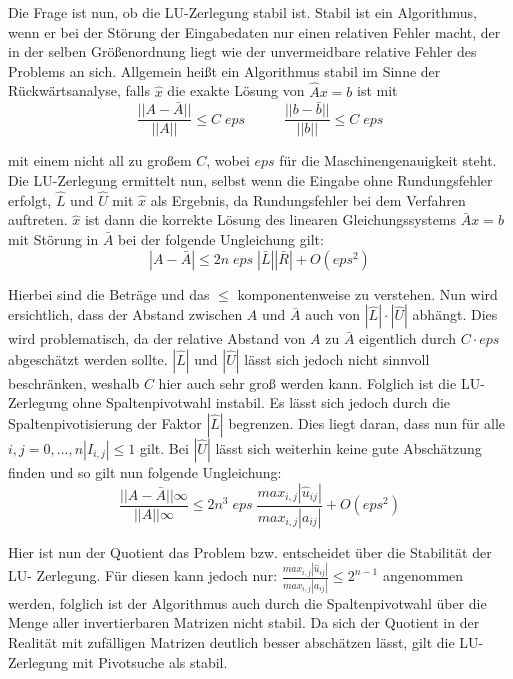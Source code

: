 \documentclass[course=erap]{aspdoc}
\begin{document}
Die Frage ist nun, ob die LU-Zerlegung stabil ist.
Stabil ist ein Algorithmus, wenn er bei der Störung der Eingabedaten nur einen relativen Fehler macht, 
der in der selben Größenordnung liegt wie der unvermeidbare relative Fehler des Problems an sich. 
Allgemein heißt ein Algorithmus stabil im Sinne der Rückwärtsanalyse, 
falls $\hat{x}$ die exakte Lösung von $\hat{A}x = b$ ist mit 	
  \begin{equation}
    \label{norm}
    \frac{|| A - \bar{A}||}{||A||} \leq C \; eps \;\; \;\;\;\;\;\;\;\;  \frac{|| b - \bar{b}||}{||b||} \leq C \; eps
  \end{equation}

mit einem nicht all zu großem $C$, wobei $eps$ für die Maschinengenauigkeit steht.
Die LU-Zerlegung ermittelt nun, selbst wenn die Eingabe ohne Rundungsfehler erfolgt, $\hat{L}$ und $\hat{U}$ mit 
$\hat{x}$ als Ergebnis, da Rundungsfehler bei dem Verfahren auftreten. $\hat{x}$ ist dann die 
korrekte Lösung des linearen Gleichungssystems $\bar{A}x=b$ mit Störung in $\bar{A}$ bei der folgende Ungleichung gilt:
  \begin{equation}
    \label{eg3}
    |A - \bar{A}| \leq 2n \; eps \; |\bar{L}||\bar{R}| + O(eps^2)
  \end{equation}

Hierbei sind die Beträge und das $\leq$ komponentenweise zu verstehen.								
Nun wird ersichtlich, dass der Abstand zwischen $A$ und $\bar{A}$ auch von $|\hat{L}| \cdot |\hat{U}|$
abhängt. Dies wird problematisch, da der relative Abstand von $A$ zu $\bar{A}$ eigentlich durch 
$C\cdot eps$ abgeschätzt werden sollte. $|\hat{L}|$ und $|\hat{U}|$ lässt sich jedoch nicht sinnvoll 
beschränken, weshalb $C$ hier auch sehr groß werden kann.
Folglich ist die LU-Zerlegung ohne Spaltenpivotwahl instabil. Es lässt sich jedoch durch die Spaltenpivotisierung 
der Faktor $|\hat{L}|$  begrenzen. Dies liegt daran, dass nun für alle $i,j = 0,...,n |I_{i,j}| \leq 1$ gilt. 
Bei $|\hat{U}|$ lässt sich weiterhin keine gute Abschätzung finden und so gilt nun folgende Ungleichung:  
  \begin{equation}
    \label{eg3}
    \frac{||A - \bar{A}||\infty}{||A||\infty} \leq 2n^3 \; eps \;\frac{max_{i,j}| \hat{u}_{ij}|}{max_{i,j}|a_{ij}|} + O(eps^2)
  \end{equation}

Hier ist nun der Quotient das Problem bzw. entscheidet über die Stabilität der LU-
Zerlegung. Für diesen kann jedoch nur: $\frac{max_{i,j}| \hat{u}_{ij}|}{max_{i,j}|a_{ij}|} \leq 2^{n-1}$ angenommen 
werden, folglich ist der Algorithmus auch durch die Spaltenpivotwahl über die Menge 
aller invertierbaren Matrizen nicht stabil. Da sich der Quotient in der Realität mit zufälligen Matrizen deutlich 
besser abschätzen lässt, gilt die LU-Zerlegung mit Pivotsuche als stabil.
\end{document}

